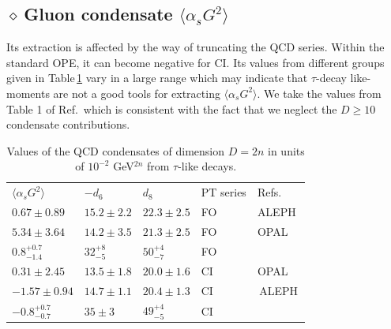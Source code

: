 \documentclass[review]{elsarticle}
\def\la{\langle}
\def\ra{\rangle}
\def\d{$\diamond~$}
\begin{document}
  \subsection*{\d Gluon condensate $\la\alpha_s G^2\ra$ }
   Its extraction is affected by the way of truncating the QCD series. Within the standard OPE, it can become negative for CI. Its values from different groups given in Table\,\ref{tab:g2} vary in a large range which may indicate that $\tau$-decay like-moments  are not a good tools for extracting $\la \alpha_s G^2\ra$.  We take the values from Table 1 of Ref.\,\cite{PICH1} which is consistent with the fact that we neglect the $D\geq 10$ condensate contributions.
   
   {\normalsize
\begin{table}[hbt]
\setlength{\tabcolsep}{1.2pc}
  \begin{center}
    {%
  \begin{tabular}{lllll}

&\\
\hline
\hline
$\la\alpha_s G^2\ra$&$-d_6$&$d_8$&PT series & Refs.\\
 \hline 
$0.67\pm 0.89$&$15.2\pm 2.2$&$22.3\pm 2.5$&    {\rm FO}&{\rm ALEPH}\,\cite{ALEPH}\\
$5.34\pm 3.64$&$14.2\pm 3.5$&$21.3\pm 2.5$&            {\rm FO}&{\rm OPAL}\,\cite{OPAL}\\
 $0.8^{+0.7}_{-1.4}$&$32^{+8}_{-5}$&$50^{+4}_{-7}$&{\rm FO}&\,\cite{PICH1}\\
$0.31\pm 2.45$&$13.5\pm 1.8$&$20.0\pm 1.6$&       {\rm CI}&{\rm OPAL}\,\cite{OPAL}\\
$-1.57\pm0.94$&$14.7\pm 1.1$&$20.4\pm 1.3$&{\rm CI}&\,{\rm ALEPH}\,\cite{DAVIER}\\
$-0.8^{+0.7}_{-0.7}$&$35\pm 3$&$49 ^{+4}_{-5}$&  {\rm CI}&\,\cite{PICH1}\\
   \hline\hline
\end{tabular}}
 \caption{ Values of the QCD condensates of dimension $D=2n$ in units of $10^{-2}$ GeV$^{2n}$ from $\tau$-like decays.  }\label{tab:g2} 
 \end{center}
\end{table}
} 
\end{document}
